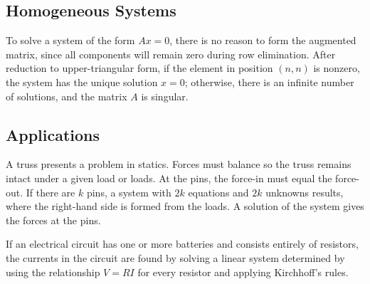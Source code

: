 \documentclass[../main.tex]{subfiles}
\begin{document}
\subsection*{Homogeneous Systems}
To solve a system of the form $Ax = 0$, there is no reason to form the augmented matrix, since all components will remain zero during row elimination. After reduction to upper-triangular form, if the element in position $(n, n)$ is nonzero, the system has the unique solution $x = 0$; otherwise, there is an infinite number of solutions, and the matrix $A$ is singular.

\subsection*{Applications}
A truss presents a problem in statics. Forces must balance so the truss remains intact under a given load or loads. At the pins, the force-in must equal the force-out. If there are $k$ pins, a system with $2k$ equations and $2k$ unknowns results, where
the right-hand side is formed from the loads. A solution of the system gives the forces at the pins.

If an electrical circuit has one or more batteries and consists entirely of resistors, the currents in the circuit are found by solving a linear system determined by using the relationship $V = RI$ for every resistor and applying Kirchhoff’s rules.
\end{document}
